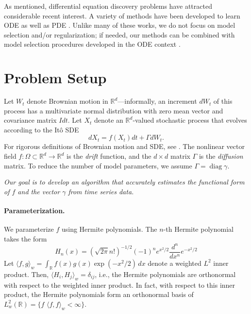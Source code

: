 \documentclass{article}
\newcommand{\opdiag}{\ensuremath{\operatorname{diag}}}
\begin{document}
As mentioned, differential equation discovery problems have attracted considerable recent interest.  A variety of methods have been developed to learn ODE \cite{brunton_discovering_2016, schon_probabilistic_2017, chen_network_2017, tran_exact_2017, schaeffer_extracting_2017, schaeffer_learning_2017, quade_sparse_2018} as well as PDE \cite{schaeffer_sparse_2013, raissi_machine_2017, rudy_data-driven_2017, raissi_hidden_2018}.  Unlike many of these works, we do not focus on model selection and/or regularization; if needed, our methods can be combined with model selection procedures developed in the ODE context \cite{mangan_inferring_2016, mangan_model_2017}.

\section{Problem Setup}
Let $W_t$ denote Brownian motion in $\mathbb{R}^d$---informally, an increment $dW_t$ of this process has a multivariate normal distribution with zero mean vector and covariance matrix $I dt$.  Let $X_t$ denote an $\mathbb{R}^d$-valued stochastic process that evolves according to the It\^{o} SDE
\begin{equation} \label{eqnsde}
d X_t = f( X_t) dt + \Gamma d W_t.
\end{equation}
For rigorous definitions of Brownian motion and SDE, see \cite{bhattacharya_stochastic_2009, oksendal_stochastic_2003}.  The nonlinear vector field $f : \Omega \subset \mathbb{R}^d \to \mathbb{R}^d$ is the \emph{drift} function, and the $d \times d$ matrix $\Gamma$ is the \emph{diffusion} matrix.  To reduce the number of model parameters, we assume $\Gamma = \opdiag \gamma$.

\emph{Our goal is to develop an algorithm that accurately estimates the functional form of $f$ and the vector $\gamma$ from time series data.}

\paragraph{Parameterization.} We parameterize $f$ using Hermite polynomials.  The $n$-th Hermite polynomial takes the form
\begin{equation}
\label{eqnhermdef}
H_n(x) = (\sqrt{2 \pi} n!)^{-1/2} (-1)^n e^{x^2/2} \dfrac{d^n}{dx^n} e^{-x^2/2}
\end{equation}
Let $\langle f, g \rangle_w = \int_{\mathbb{R}} f(x) g(x) \exp(-x^2/2) \, dx$ denote a weighted $L^2$ inner product.  Then, $\langle H_i, H_j \rangle_w = \delta_{ij}$, i.e., the Hermite polynomials are orthonormal with respect to the weighted inner product.  In fact, with respect to this inner product, the Hermite polynomials form an orthonormal basis of $L^2_w(\mathbb{R}) = \{ f \,  \, \langle f, f \rangle_w < \infty \}$.
\end{document}

